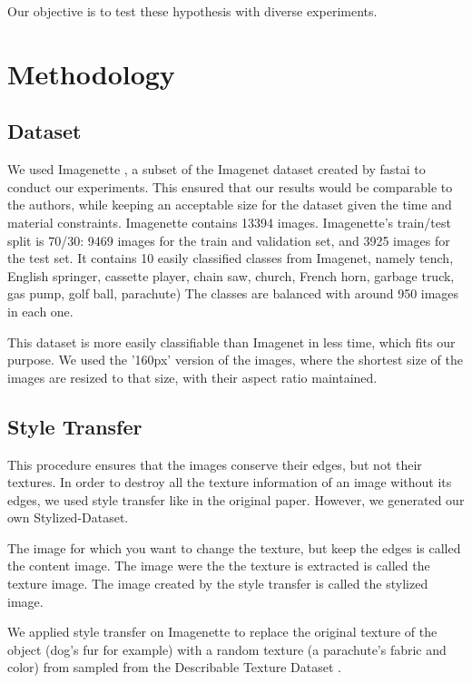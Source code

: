 \documentclass{article}
\begin{document}
Our objective is to test these hypothesis with diverse experiments.

\section{Methodology}

\subsection{Dataset}

We used Imagenette \cite{fastai2019}, a subset of the Imagenet dataset created 
by fastai to conduct our experiments.
This ensured that our results would be comparable to the authors, 
while keeping an acceptable size for the dataset given the time and material constraints.
Imagenette contains 13394 images.
Imagenette's train/test split is 70/30: 9469 images for the train and validation set, and 3925 images for the test set.
It contains 10 easily classified classes from Imagenet, namely
tench, English springer, cassette player, chain saw, church, French horn, garbage truck, gas pump, golf ball, parachute)
The classes are balanced with around 950 images in each one.

This dataset is more easily classifiable than Imagenet in less time, which fits our purpose.
We used the '160px' version of the images, where the shortest size of the images are resized to that size, 
with their aspect ratio maintained.


\subsection{Style Transfer}

This procedure ensures that the images conserve their edges, but not their textures.
In order to destroy all the texture information of an image without its edges, we used style transfer like in
the original paper.
However, we generated our own Stylized-Dataset. \smallskip

\noindent
The image for which you want to change the texture, but keep the edges is called the content image.
The image were the the texture is extracted is called the texture image.
The image created by the style transfer is called the stylized image. \smallskip

\noindent
We applied style transfer on Imagenette to replace the original texture of the object (dog's fur for example) 
with a random texture (a parachute's fabric and color) 
from sampled from the Describable Texture Dataset \cite{cimpoi14describing}. \smallskip
\end{document}
